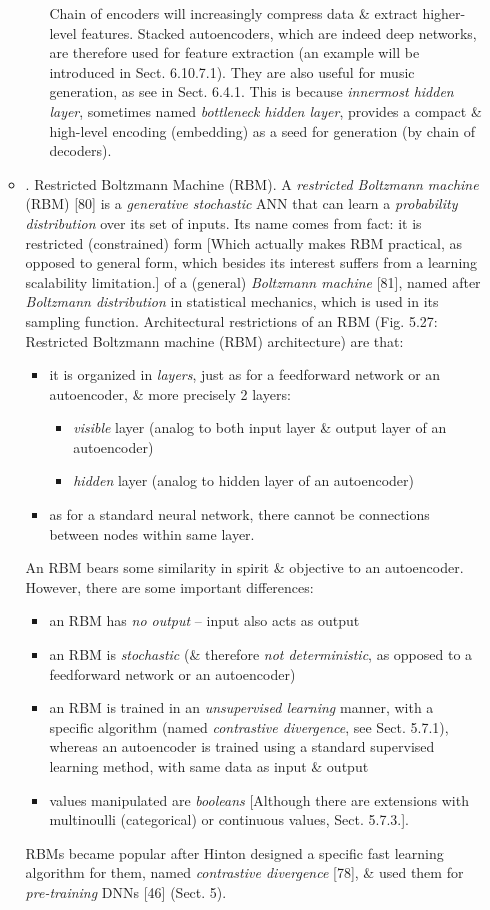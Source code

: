\documentclass{article}
\begin{document}
\begin{itemize}
\begin{itemize}
\begin{itemize}
			Chain of encoders will increasingly compress data \& extract higher-level features. Stacked autoencoders, which are indeed deep networks, are therefore used for feature extraction (an example will be introduced in Sect. 6.10.7.1). They are also useful for music generation, as see in Sect. 6.4.1. This is because {\it innermost hidden layer}, sometimes named {\it bottleneck hidden layer}, provides a compact \& high-level encoding (embedding) as a seed for generation (by chain of decoders).
		\end{itemize}
		\item {. Restricted Boltzmann Machine (RBM).} A {\it restricted Boltzmann machine} (RBM) [80] is a {\it generative stochastic} ANN that can learn a {\it probability distribution} over its set of inputs. Its name comes from fact: it is restricted (constrained) form [Which actually makes RBM practical, as opposed to general form, which besides its interest suffers from a learning scalability limitation.] of a (general) {\it Boltzmann machine} [81], named after {\it Boltzmann distribution} in statistical mechanics, which is used in its sampling function. Architectural restrictions of an RBM ({\sf Fig. 5.27: Restricted Boltzmann machine (RBM) architecture}) are that:
		\begin{itemize}
			\item it is organized in {\it layers}, just as for a feedforward network or an autoencoder, \& more precisely 2 layers:
			\begin{itemize}
				\item {\it visible} layer (analog to both input layer \& output layer of an autoencoder)
				\item {\it hidden} layer (analog to hidden layer of an autoencoder)
			\end{itemize}
			\item as for a standard neural network, there cannot be connections between nodes within same layer.
		\end{itemize}
		An RBM bears some similarity in spirit \& objective to an autoencoder. However, there are some important differences:
		\begin{itemize}
			\item an RBM has {\it no output} -- input also acts as output
			\item an RBM is {\it stochastic} (\& therefore {\it not deterministic}, as opposed to a feedforward network or an autoencoder)
			\item an RBM is trained in an {\it unsupervised learning} manner, with a specific algorithm (named {\it contrastive divergence}, see Sect. 5.7.1), whereas an autoencoder is trained using a standard supervised learning method, with same data as input \& output
			\item values manipulated are {\it booleans} [Although there are extensions with multinoulli (categorical) or continuous values, Sect. 5.7.3.].
		\end{itemize}
		RBMs became popular after {\sc Hinton} designed a specific fast learning algorithm for them, named {\it contrastive divergence} [78], \& used them for {\it pre-training} DNNs [46] (Sect. 5).
		

\end{itemize}
\end{itemize}
\end{document}
